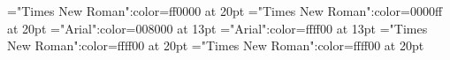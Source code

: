 \documentclass[a4paper]{article}
\begin{document}
 
\pagestyle{plain} 
\font\ta="Times New Roman":color=ff0000 at 20pt
\font\tbta="Times New Roman":color=0000ff at 20pt
\font\tctbta="Arial":color=008000 at 13pt
\font\tdtctbta="Arial":color=ffff00 at 13pt
\font\tdtbta="Times New Roman":color=ffff00 at 20pt
\font\tdta="Times New Roman":color=ffff00 at 20pt

\pagestyle{fancy} 








\end{document}
